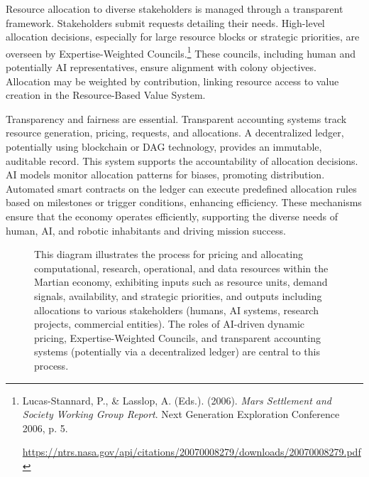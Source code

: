 \documentclass[fontsize=10pt, oneside, DIV=calc]{scrartcl}
\begin{document}
\medskip

\noindent
Resource allocation to diverse stakeholders is managed through a transparent framework. Stakeholders submit requests detailing their needs. High-level allocation decisions, especially for large resource blocks or strategic priorities, are overseen by Expertise-Weighted Councils.\footnote{Lucas-Stannard, P., \& Lasslop, A. (Eds.). (2006). \textit{Mars Settlement and Society Working Group Report}. Next Generation Exploration Conference 2006, p. 5. 







\href{https://ntrs.nasa.gov/api/citations/20070008279/downloads/20070008279.pdf}\url{https://ntrs.nasa.gov/api/citations/20070008279/downloads/20070008279.pdf}} These councils, including human and potentially AI representatives, ensure alignment with colony objectives. Allocation may be weighted by contribution, linking resource access to value creation in the Resource-Based Value System.

\medskip

\noindent
Transparency and fairness are essential. Transparent accounting systems track resource generation, pricing, requests, and allocations. A decentralized ledger, potentially using blockchain or DAG technology, provides an immutable, auditable record. This system supports the accountability of allocation decisions. AI models monitor allocation patterns for biases, promoting distribution. Automated smart contracts on the ledger can execute predefined allocation rules based on milestones or trigger conditions, enhancing efficiency. These mechanisms ensure that the economy operates efficiently, supporting the diverse needs of human, AI, and robotic inhabitants and driving mission success.

\medskip



\begin{figure}[H]
  \centering
  \noindent
  \begin{minipage}{\textwidth}
    \centering
    \caption{This diagram illustrates the process for pricing and allocating computational, research, operational, and data resources within the Martian economy, exhibiting inputs such as resource units, demand signals, availability, and strategic priorities, and outputs including allocations to various stakeholders (humans, AI systems, research projects, commercial entities). The roles of AI-driven dynamic pricing, Expertise-Weighted Councils, and transparent accounting systems (potentially via a decentralized ledger) are central to this process.}
  \end{minipage}
\end{figure}
\end{document}
